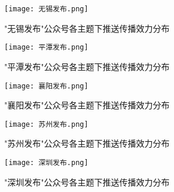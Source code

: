 \begin{figure}
  \centering
  \texttt{[image: 无锡发布.png]}
  \caption{"无锡发布"公众号各主题下推送传播效力分布}
  \label{fig:无锡发布-box}
\end{figure}

\begin{figure}
  \centering
  \texttt{[image: 平潭发布.png]}
  \caption{"平潭发布"公众号各主题下推送传播效力分布}
  \label{fig:平潭发布-box}
\end{figure}

\begin{figure}
  \centering
  \texttt{[image: 襄阳发布.png]}
  \caption{"襄阳发布"公众号各主题下推送传播效力分布}
  \label{fig:襄阳发布-box}
\end{figure}

\begin{figure}
  \centering
  \texttt{[image: 苏州发布.png]}
  \caption{"苏州发布"公众号各主题下推送传播效力分布}
  \label{fig:苏州发布-box}
\end{figure}

\begin{figure}
  \centering
  \texttt{[image: 深圳发布.png]}
  \caption{"深圳发布"公众号各主题下推送传播效力分布}
  \label{fig:深圳发布-box}
\end{figure}
